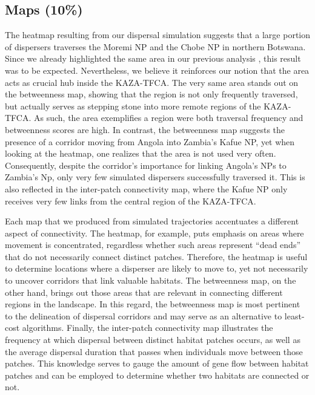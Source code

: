 \documentclass[abstract=on,10pt,a4paper,bibliography=totocnumbered]{article}
\begin{document}
\subsection{Maps (10\%)}
The heatmap resulting from our dispersal simulation suggests that a large
portion of dispersers traverses the Moremi NP and the Chobe NP in northern
Botswana. Since we already highlighted the same area in our previous analysis
\citep{Hofmann.2021}, this result was to be expected. Nevertheless, we believe
it reinforces our notion that the area acts as crucial hub inside the KAZA-TFCA.
The very same area stands out on the betweenness map, showing that the region is
not only frequently traversed, but actually serves as stepping stone into more
remote regions of the KAZA-TFCA. As such, the area exemplifies a region were
both traversal frequency and betweenness scores are high. In contrast, the
betweenness map suggests the presence of a corridor moving from Angola into
Zambia's Kafue NP, yet when looking at the heatmap, one realizes that the area
is not used very often. Consequently, despite the corridor's importance for
linking Angola's NPs to Zambia's Np, only very few simulated dispersers
successfully traversed it. This is also reflected in the inter-patch
connectivity map, where the Kafue NP only receives very few links from the
central region of the KAZA-TFCA.

Each map that we produced from simulated trajectories accentuates a different
aspect of connectivity. The heatmap, for example, puts emphasis on areas where
movement is concentrated, regardless whether such areas represent ``dead ends''
that do not necessarily connect distinct patches. Therefore, the heatmap is
useful to determine locations where a disperser are likely to move to, yet not
necessarily to uncover corridors that link valuable habitats. The betweenness
map, on the other hand, brings out those areas that are relevant in connecting
different regions in the landscape. In this regard, the betweenness map is most
pertinent to the delineation of dispersal corridors and may serve as an
alternative to least-cost algorithms. Finally, the inter-patch connectivity map
illustrates the frequency at which dispersal between distinct habitat patches
occurs, as well as the average dispersal duration that passes when individuals
move between those patches. This knowledge serves to gauge the amount of
gene flow between habitat patches and can be employed to determine whether two
habitats are connected or not.
\end{document}
